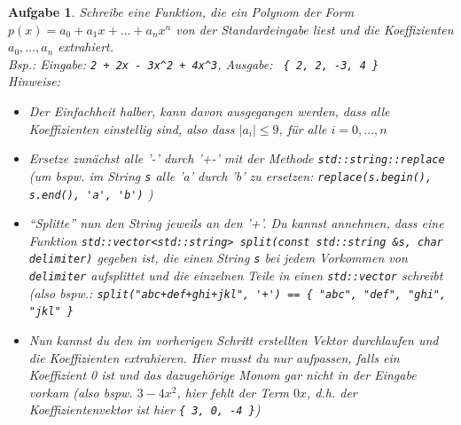 \documentclass[a4paper,12pt,parskip=full]{scrartcl}
\theoremstyle{exercise}
\newtheorem{exercise}{Aufgabe}
\begin{document}
\begin{exercise}
Schreibe eine Funktion, die ein Polynom der Form
$p(x) = a_0 + a_1 x + \dots + a_nx^n$ von der Standardeingabe liest
und die Koeffizienten $a_0, \dots, a_n$ extrahiert. \\
Bsp.: Eingabe: \texttt{2 + 2x - 3x\textasciicircum 2 + 4x\textasciicircum 3}, Ausgabe: \texttt{ \{ 2, 2, -3, 4 \} } \\
Hinweise:
\begin{itemize}
\item Der Einfachheit halber, kann davon ausgegangen werden, dass alle
  Koeffizienten einstellig sind, also dass $|a_i| \le 9$, für alle
  $i=0,\dots,n$
\item Ersetze zunächst alle '-' durch '+-' mit der Methode
  \lstinline{std::string::replace} (um bspw. im String \lstinline{s}
  alle 'a' durch 'b' zu ersetzen: \lstinline{replace(s.begin(), s.end(), 'a', 'b')} )
\item ``Splitte'' nun den String jeweils an den '+'. Du kannst
  annehmen, dass eine Funktion \lstinline{std::vector<std::string> split(const std::string &s, char delimiter)} gegeben ist, die
  einen String \lstinline{s} bei jedem Vorkommen von
  \lstinline{delimiter} aufsplittet und die einzelnen Teile in einen
  \lstinline{std::vector} schreibt (also bspw.:
  \lstinline|split("abc+def+ghi+jkl", '+') == { "abc", "def", "ghi", "jkl" }|
\item Nun kannst du den im vorherigen Schritt erstellten Vektor
  durchlaufen und die Koeffizienten extrahieren. Hier musst du nur
  aufpassen, falls ein Koeffizient 0 ist und das dazugehörige Monom
  gar nicht in der Eingabe vorkam (also bspw. $3 - 4x^2$, hier fehlt
  der Term $0x$, d.h. der Koeffizientenvektor ist hier \texttt{\{ 3,
    0, -4 \}})
\end{itemize}
\end{exercise}
\end{document}
